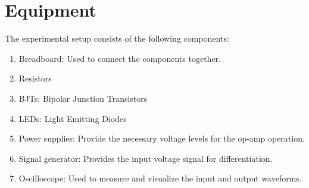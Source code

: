 \section{Equipment}
The experimental setup consists of the following components:

\begin{enumerate}

    \item Breadboard: 
        Used to connect the components together.

    \item Resistors
    
    \item BJTs: Bipolar Junction Transistors
    
    \item LEDs: Light Emitting Diodes
       
    
    \item Power supplies: 
        Provide the necessary voltage levels for the op-amp operation.
    
    \item Signal generator: 
        Provides the input voltage signal for differentiation.
    
    \item Oscilloscope: 
        Used to measure and visualize the input and output waveforms.

\end{enumerate}